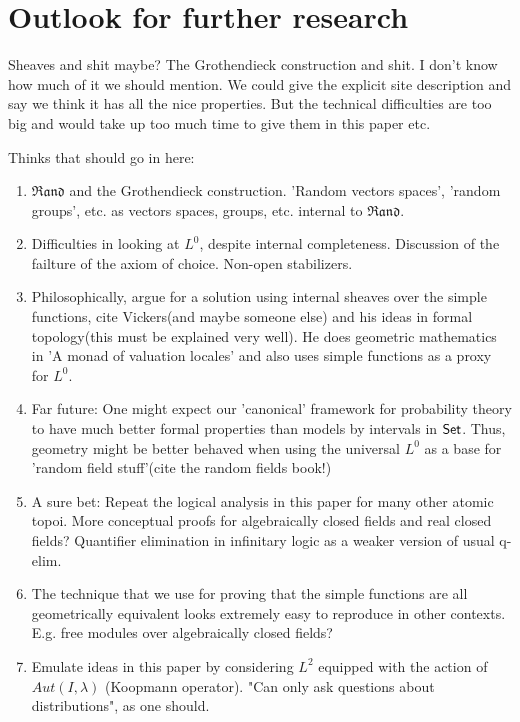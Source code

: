 \documentclass[a4paper]{amsproc}
\theoremstyle{plain}
\theoremstyle{definition}
\theoremstyle{remark}
\numberwithin{equation}{section}
\newcommand{\Set}{\textup{\textsf{Set}}}
\begin{document}
\section{Outlook for further research}

Sheaves and shit maybe? The Grothendieck construction and shit. I don't know how much of it we should mention. We could give the explicit site description and say we think it has all the nice properties. But the technical difficulties are too big and would take up too much time to give them in this paper etc.

Thinks that should go in here:
\begin{enumerate}
    \item $\mathfrak{Rand}$ and the Grothendieck construction. 'Random vectors spaces', 'random groups', etc. as vectors spaces, groups, etc. internal to $\mathfrak{Rand}$.
    \item Difficulties in looking at $L^0$, despite internal completeness. Discussion of the failture of the axiom of choice. Non-open stabilizers.
    \item Philosophically, argue for a solution using internal sheaves over the simple functions, cite Vickers(and maybe someone else) and his ideas in formal topology(this must be explained very well). He does geometric mathematics in 'A monad of valuation locales' and also uses simple functions as a proxy for $L^0$.
    \item Far future: One might expect our 'canonical' framework for probability theory to have much better formal properties than models by intervals in $\Set$. Thus, geometry might be better behaved when using the universal $L^0$ as a base for 'random field stuff'(cite the random fields book!)
    \item A sure bet: Repeat the logical analysis in this paper for many other atomic topoi. More conceptual proofs for algebraically closed fields and real closed fields? Quantifier elimination in infinitary logic as a weaker version of usual q-elim.
    \item The technique that we use for proving that the simple functions are all geometrically equivalent looks extremely easy to reproduce in other contexts. E.g. free modules over algebraically closed fields?
    \item Emulate ideas in this paper by considering $L^2$ equipped with the action of $Aut(I,\lambda)$ (Koopmann operator). "Can only ask questions about distributions", as one should.
\end{enumerate}
\end{document}
